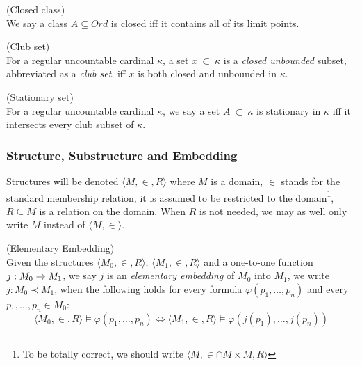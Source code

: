 \begin{definition}{(Closed class)}\label{def:closed_class}\\
We say a class $A \subseteq Ord$ is closed iff it contains all of its limit points.
\end{definition}

\begin{definition}{(Club set)}\label{def:club_set}\\
For a regular uncountable cardinal $\kappa$, a set $x\ \subset\ \kappa$ is a \emph{closed unbounded} subset, abbreviated as a \emph{club set}, iff $x$ is both closed and unbounded in $\kappa$.
\end{definition}

\begin{definition}{(Stationary set)}\label{def:stationary_set}\\
For a regular uncountable cardinal $\kappa$, we say a set $A\ \subset\ \kappa$ is stationary in $\kappa$ iff it intersects every club subset of $\kappa$.
\end{definition}

\subsubsection{Structure, Substructure and Embedding}

Structures will be denoted $\langle M, \in, R \rangle$ where $M$ is a domain, $\in$ stands for the standard membership relation, it is assumed to be restricted to the domain\footnote{To be totally correct, we should write $\langle M, \in \cap M \times M, R \rangle$}, $R \subseteq M$ is a relation on the domain. When $R$ is not needed, we may as well only write $M$ instead of $\langle M, \in \rangle$.

\begin{definition}{(Elementary Embedding)}\label{def:elementary_embedding}\\
Given the structures $\langle M_0, \in, R \rangle$, $\langle M_1, \in, R \rangle$ and a one-to-one function $j: M_0 \rightarrow M_1$, we say $j$ is an \emph{elementary embedding} of $M_0$ into $M_1$, we write $j: M_0 \prec M_1$, when the following holds for every formula $\varphi(p_1, \ldots, p_n)$ and every $p_1, \ldots, p_n \in M_0$:
\begin{equation}
\langle M_0, \in, R \rangle \models \varphi(p_1, \ldots, p_n) \iff \langle M_1, \in, R \rangle  \models \varphi(j(p_1), \ldots, j(p_n))
\end{equation}
\end{definition}


